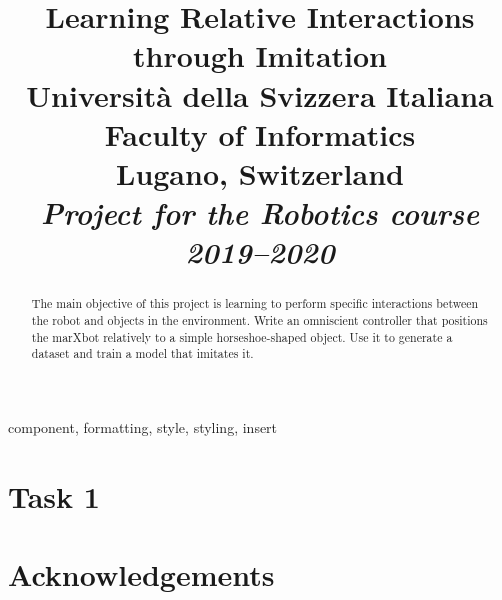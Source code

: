 \documentclass[conference]{IEEEtran}
\begin{document}
\title{Learning Relative Interactions through Imitation \\ \vspace{0.5\baselineskip}
{
	\large {Università della Svizzera Italiana}\\
	{Faculty of Informatics} \\
	Lugano, Switzerland \\
	\textit{Project for the Robotics course 2019--2020}\\
}
}

\author{
\and
{}
}

\maketitle
\thispagestyle{plain}
\pagestyle{plain}

\begin{abstract}
The main objective of this project is learning to perform specific interactions between the robot and objects in the 
environment.
Write an omniscient controller that positions the marXbot relatively to a simple horseshoe-shaped object. Use it to 
generate a dataset and train a model that imitates it.
\end{abstract}

\begin{IEEEkeywords}
component, formatting, style, styling, insert
\end{IEEEkeywords}




\section{Task 1}








\section*{Acknowledgements}




\end{document}
